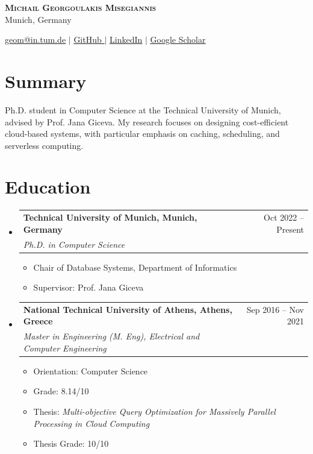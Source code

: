 \documentclass[letterpaper,11pt]{article}
\makeatletter
\newcommand{\resumeItem}[1]{
  \item\small{
    {#1 \vspace{-2pt}}
  }
}
\newcommand{\resumeSubheading}[4]{
  \vspace{-2pt}\item
    \begin{tabular*}{0.97\textwidth}[t]{l@{\extracolsep{\fill}}r}
      \textbf{#1} & #2 \\
      \textit{\small#3} & \textit{\small #4} \\
    \end{tabular*}\vspace{-7pt}
}
\newcommand{\resumeSubHeadingListStart}{\begin{itemize}[leftmargin=0.15in, label={}]}
\newcommand{\resumeSubHeadingListEnd}{\end{itemize}}
\newcommand{\resumeItemListStart}{\begin{itemize}}
\newcommand{\resumeItemListEnd}{\end{itemize}\vspace{-5pt}}
\makeatother
\begin{document}
\begin{center}
    \textbf{\Huge \scshape Michail Georgoulakis Misegiannis} \\ \vspace{1pt}
    \small Munich, Germany

    \href{mailto:geom@in.tum.de}{\underline{geom@in.tum.de}} $|$
    \href{https://github.com/mikegeo98}{\underline{GitHub }}$|$
    \href{https://gr.linkedin.com/in/michalis-georgoulakis-misegiannis-26355322b}{\underline{LinkedIn}} $|$
    \href{https://scholar.google.com/citations?user=gez8X_8AAAAJ&hl=el&oi=ao}{\underline{Google Scholar}}
\end{center}
\section{Summary}
Ph.D. student in Computer Science at the Technical University of Munich, advised by Prof. Jana Giceva. My research focuses on designing cost-efficient cloud-based systems, with particular emphasis on caching, scheduling, and serverless computing.
\section{Education}
\resumeSubHeadingListStart
\resumeSubheading
{Technical University of Munich, Munich, Germany}{Oct 2022 -- Present}
{Ph.D. in Computer Science}{}
\resumeItemListStart
\resumeItem{Chair of Database Systems, Department of Informatics}
\resumeItem{Supervisor: Prof. Jana Giceva}
\resumeItemListEnd
\resumeSubheading
{National Technical University of Athens, Athens, Greece}{Sep 2016 -- Nov 2021}
{Master in Engineering (M. Eng), Electrical and Computer Engineering}{}
\resumeItemListStart
\resumeItem{Orientation: Computer Science}
\resumeItem{Grade: 8.14/10}
\resumeItem{Thesis: \textit{Multi-objective Query Optimization for Massively Parallel Processing in Cloud Computing}}
\resumeItem{Thesis Grade: 10/10}
\resumeItemListEnd
\resumeSubHeadingListEnd
\end{document}
